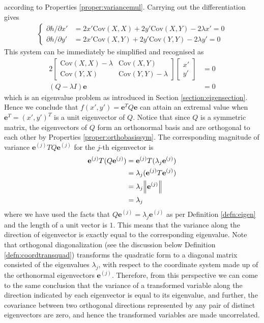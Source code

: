 according to Properties \ref{proper:variancemul}. Carrying out the differentiation gives
\begin{align*}
\begin{cases}
\partial h/\partial x' &= 2x'\text{Cov}(X, X) + 2y'\text{Cov}(X, Y) - 2\lambda x' = 0 \\
\partial h/\partial y' &= 2x'\text{Cov}(X, Y) + 2y'\text{Cov}(Y, Y) - 2\lambda y' = 0
\end{cases}    
\end{align*}
This system can be immediately be simplified and recognised as
\begin{align*}
2 \begin{bmatrix}
\text{Cov}(X, X)-\lambda & \text{Cov}(X, Y) \\
\text{Cov}(Y, X) & \text{Cov}(Y, Y)-\lambda
\end{bmatrix}
\begin{bmatrix}
x' \\
y'
\end{bmatrix} &= 0\\
(Q-\lambda I)\textbf{e} &= 0
\end{align*}
which is an eigenvalue problem as introduced in Section \ref{section:eigensection}. Hence we conclude that $f(x',y') = \textbf{e}^T Q \textbf{e}$ can attain an extremal value when $\textbf{e}^T = (x',y')^T$ is a unit eigenvector of $Q$. Notice that since $Q$ is a symmetric matrix, the eigenvectors of $Q$ form an orthonormal basis and are orthogonal to each other by Properties \ref{proper:orthobasissym}. The corresponding magnitude of variance ${\textbf{e}^{(j)}T} Q \textbf{e}^{(j)}$ for the $j$-th eigenvector is
\begin{align*}
{\textbf{e}^{(j)}T} (Q \textbf{e}^{(j)}) &= {\textbf{e}^{(j)}T} (\lambda_j \textbf{e}^{(j)}) \\
&= \lambda_j ({\textbf{e}^{(j)}T} \textbf{e}^{(j)}) \\
&= \lambda_j \norm{\textbf{e}^{(j)}} \\
&= \lambda_j 
\end{align*}
where we have used the facts that $Q \textbf{e}^{(j)} = \lambda_j \textbf{e}^{(j)}$ as per Definition \ref{defn:eigen} and the length of a unit vector is $1$. This means that the variance along the direction of eigenvector is exactly equal to the corresponding eigenvalue. Note that orthogonal diagonalization (see the discussion below Definition \ref{defn:coordtransquad}) transforms the quadratic form to a diagonal matrix consisted of the eigenvalues $\lambda_j$, with respect to the coordinate system made up of the orthonormal eigenvectors $\textbf{e}^{(j)}$. Therefore, from this perspective we can come to the same conclusion that the variance of a transformed variable along the direction indicated by each eigenvector is equal to its eigenvalue, and further, the covariance between two orthogonal directions represented by any pair of distinct eigenvectors are zero, and hence the transformed variables are made uncorrelated. 
